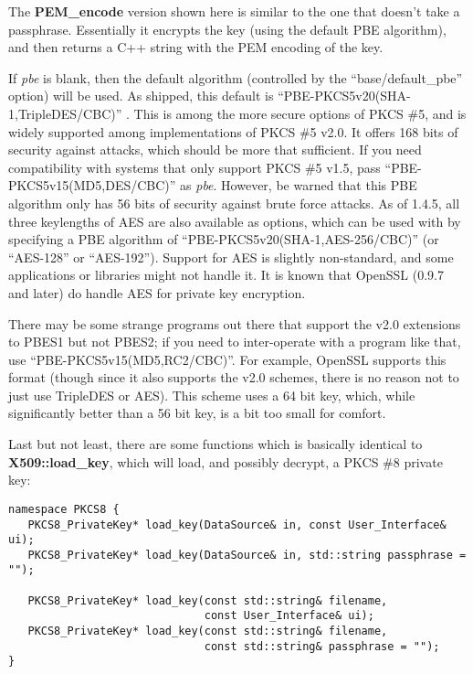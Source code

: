 \documentclass{article}
\newcommand{\function}[1]{\textbf{#1}}
\renewcommand{\arg}[1]{\textsl{#1}}
\begin{document}
The \function{PEM\_encode} version shown here is similar to the one that
doesn't take a passphrase. Essentially it encrypts the key (using the default
PBE algorithm), and then returns a C++ string with the PEM encoding of the key.

If \arg{pbe} is blank, then the default algorithm (controlled by the
``base/default\_pbe'' option) will be used. As shipped, this default is
``PBE-PKCS5v20(SHA-1,TripleDES/CBC)'' . This is among the more secure options
of PKCS \#5, and is widely supported among implementations of PKCS \#5 v2.0. It
offers 168 bits of security against attacks, which should be more that
sufficient. If you need compatibility with systems that only support PKCS \#5
v1.5, pass ``PBE-PKCS5v15(MD5,DES/CBC)'' as \arg{pbe}. However, be warned that
this PBE algorithm only has 56 bits of security against brute force attacks. As
of 1.4.5, all three keylengths of AES are also available as options, which can
be used with by specifying a PBE algorithm of
``PBE-PKCS5v20(SHA-1,AES-256/CBC)'' (or ``AES-128'' or ``AES-192''). Support
for AES is slightly non-standard, and some applications or libraries might not
handle it. It is known that OpenSSL (0.9.7 and later) do handle AES for private
key encryption.

There may be some strange programs out there that support the v2.0 extensions
to PBES1 but not PBES2; if you need to inter-operate with a program like that,
use ``PBE-PKCS5v15(MD5,RC2/CBC)''. For example, OpenSSL supports this format
(though since it also supports the v2.0 schemes, there is no reason not to just
use TripleDES or AES). This scheme uses a 64 bit key, which, while
significantly better than a 56 bit key, is a bit too small for comfort.

Last but not least, there are some functions which is basically identical to
\function{X509::load\_key}, which will load, and possibly decrypt, a PKCS \#8
private key:

\begin{verbatim}
namespace PKCS8 {
   PKCS8_PrivateKey* load_key(DataSource& in, const User_Interface& ui);
   PKCS8_PrivateKey* load_key(DataSource& in, std::string passphrase = "");

   PKCS8_PrivateKey* load_key(const std::string& filename,
                              const User_Interface& ui);
   PKCS8_PrivateKey* load_key(const std::string& filename,
                              const std::string& passphrase = "");
}
\end{verbatim}
\end{document}
